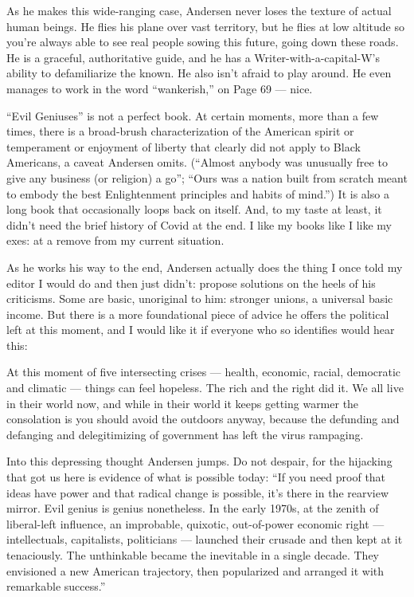 As he makes this wide-ranging case, Andersen never loses the texture of
actual human beings. He flies his plane over vast territory, but he
flies at low altitude so you're always able to see real people sowing
this future, going down these roads. He is a graceful, authoritative
guide, and he has a Writer-with-a-capital-W's ability to defamiliarize
the known. He also isn't afraid to play around. He even manages to work
in the word ``wankerish,'' on Page 69 --- nice.

``Evil Geniuses'' is not a perfect book. At certain moments, more than a
few times, there is a broad-brush characterization of the American
spirit or temperament or enjoyment of liberty that clearly did not apply
to Black Americans, a caveat Andersen omits. (``Almost anybody was
unusually free to give any business (or religion) a go''; ``Ours was a
nation built from scratch meant to embody the best Enlightenment
principles and habits of mind.'') It is also a long book that
occasionally loops back on itself. And, to my taste at least, it didn't
need the brief history of Covid at the end. I like my books like I like
my exes: at a remove from my current situation.

As he works his way to the end, Andersen actually does the thing I once
told my editor I would do and then just didn't: propose solutions on the
heels of his criticisms. Some are basic, unoriginal to him: stronger
unions, a universal basic income. But there is a more foundational piece
of advice he offers the political left at this moment, and I would like
it if everyone who so identifies would hear this:

At this moment of five intersecting crises --- health, economic, racial,
democratic and climatic --- things can feel hopeless. The rich and the
right did it. We all live in their world now, and while in their world
it keeps getting warmer the consolation is you should avoid the outdoors
anyway, because the defunding and defanging and delegitimizing of
government has left the virus rampaging.

Into this depressing thought Andersen jumps. Do not despair, for the
hijacking that got us here is evidence of what is possible today: ``If
you need proof that ideas have power and that radical change is
possible, it's there in the rearview mirror. Evil genius is genius
nonetheless. In the early 1970s, at the zenith of liberal-left
influence, an improbable, quixotic, out-of-power economic right ---
intellectuals, capitalists, politicians --- launched their crusade and
then kept at it tenaciously. The unthinkable became the inevitable in a
single decade. They envisioned a new American trajectory, then
popularized and arranged it with remarkable success.''

